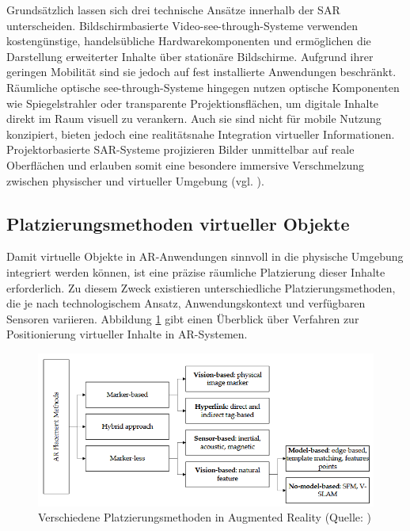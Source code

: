 Grundsätzlich lassen sich drei technische Ansätze innerhalb der \ac{SAR} unterscheiden. Bildschirmbasierte Video-see-through-Systeme verwenden kostengünstige, handelsübliche Hardwarekomponenten und ermöglichen die Darstellung erweiterter Inhalte über stationäre Bildschirme. Aufgrund ihrer geringen Mobilität sind sie jedoch auf fest installierte Anwendungen beschränkt. Räumliche optische see-through-Systeme hingegen nutzen optische Komponenten wie Spiegelstrahler oder transparente Projektionsflächen, um digitale Inhalte direkt im Raum visuell zu verankern. Auch sie sind nicht für mobile Nutzung konzipiert, bieten jedoch eine realitätsnahe Integration virtueller Informationen. Projektorbasierte \ac{SAR}-Systeme projizieren Bilder unmittelbar auf reale Oberflächen und erlauben somit eine besondere immersive Verschmelzung zwischen physischer und virtueller Umgebung (vgl. \citealp[S. 348]{carmigniani_augmented_2011}).

\subsection{Platzierungsmethoden virtueller Objekte}
Damit virtuelle Objekte in \ac{AR}-Anwendungen sinnvoll in die physische Umgebung integriert werden können, ist eine präzise räumliche Platzierung dieser Inhalte erforderlich. Zu diesem Zweck existieren unterschiedliche Platzierungsmethoden, die je nach technologischem Ansatz, Anwendungskontext und verfügbaren Sensoren variieren. Abbildung \ref{fig:placement-ar} gibt einen Überblick über Verfahren zur Positionierung virtueller Inhalte in \ac{AR}-Systemen.

\begin{figure}[ht]
\centering
\includegraphics[width=1\linewidth]{content/pictures/placement-methods.PNG}
\caption{Verschiedene Platzierungsmethoden in Augmented Reality (Quelle: \citealp[S. 3]{el_barhoumi_assessment_2022})}
\label{fig:placement-ar}
\end{figure}

